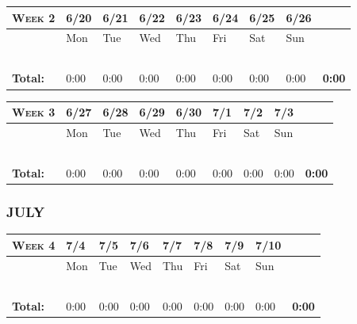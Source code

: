 \documentclass{article}
\begin{document}
\begin{tabular}{ |m{1cm}||m{1cm}|m{1cm}|m{1cm}|m{1cm}|m{1cm}|m{1cm}|m{1cm}||m{1cm}|} 
\hline
\textsc{Week 2} & 6/20 & 6/21 & 6/22 & 6/23 & 6/24 & 6/25 & 6/26 & \\ 
\hline
\rowcolor{lightgray} 
\cellcolor{white} & Mon & Tue & Wed & Thu & Fri & Sat & Sun & \cellcolor{white}\\ 
\hline
\hline
 & & & & & & & & \\ 
\hline
 & & & & & & & & \\ 
\hline
 & & & & & & & & \\ 
\hline
 & & & & & & & & \\ 
\hline
 & & & & & & & & \\ 
\hline
\textbf{Total:} & 0:00 & 0:00 & 0:00 & 0:00 & 0:00 & 0:00 & 0:00 & \textbf{0:00} \\
\hline
\end{tabular}

\vspace{0.2in}

\begin{tabular}{ |m{1cm}||m{1cm}|m{1cm}|m{1cm}|m{1cm}|m{1cm}|m{1cm}|m{1cm}||m{1cm}|} 
\hline
\textsc{Week 3} & 6/27 & 6/28 & 6/29 & 6/30 & 7/1 & 7/2 & 7/3 & \\ 
\hline
\rowcolor{lightgray} 
\cellcolor{white} & Mon & Tue & Wed & Thu & Fri & Sat & Sun & \cellcolor{white}\\ 
\hline
\hline
 & & & & & & & & \\ 
\hline
 & & & & & & & & \\ 
\hline
 & & & & & & & & \\ 
\hline
 & & & & & & & & \\ 
\hline
 & & & & & & & & \\ 
\hline
\textbf{Total:} & 0:00 & 0:00 & 0:00 & 0:00 & 0:00 & 0:00 & 0:00 & \textbf{0:00} \\
\hline
\end{tabular}

\vspace{0.2in}

\subsubsection*{JULY}

\begin{tabular}{ |m{1cm}||m{1cm}|m{1cm}|m{1cm}|m{1cm}|m{1cm}|m{1cm}|m{1cm}||m{1cm}|} 
\hline
\textsc{Week 4} & 7/4 & 7/5 & 7/6 & 7/7 & 7/8 & 7/9 & 7/10 & \\ 
\hline
\rowcolor{lightgray} 
\cellcolor{white} & Mon & Tue & Wed & Thu & Fri & Sat & Sun & \cellcolor{white}\\ 
\hline
\hline
 & & & & & & & & \\ 
\hline
 & & & & & & & & \\ 
\hline
 & & & & & & & & \\ 
\hline
 & & & & & & & & \\ 
\hline
 & & & & & & & & \\ 
\hline
\textbf{Total:} & 0:00 & 0:00 & 0:00 & 0:00 & 0:00 & 0:00 & 0:00 & \textbf{0:00} \\
\hline
\end{tabular}
\end{document}
